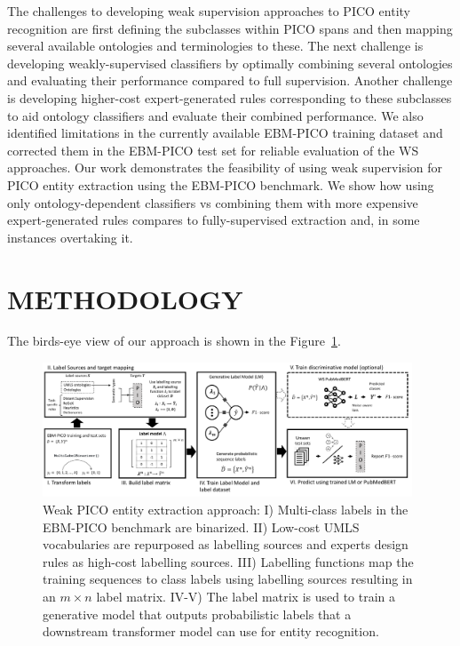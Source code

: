 \documentclass[10.7pt,]{article}
\begin{document}
The challenges to developing weak supervision approaches to PICO entity recognition are first defining the subclasses within PICO spans and then mapping several available ontologies and terminologies to these.
The next challenge is developing weakly-supervised classifiers by optimally combining several ontologies and evaluating their performance compared to full supervision.
Another challenge is developing higher-cost expert-generated rules corresponding to these subclasses to aid ontology classifiers and evaluate their combined performance.
We also identified limitations in the currently available EBM-PICO training dataset and corrected them in the EBM-PICO test set for reliable evaluation of the WS approaches.
Our work demonstrates the feasibility of using weak supervision for PICO entity extraction using the EBM-PICO benchmark.
We show how using only ontology-dependent classifiers vs combining them with more expensive expert-generated rules compares to fully-supervised extraction and, in some instances overtaking it.
%
%
%
\section{METHODOLOGY}\label{methods}
%
The birds-eye view of our approach is shown in the Figure~\ref{fig:approach}.
%
\begin{figure}[ht]
\centering
\includegraphics[width=0.98\textwidth]{figures/approach.pdf}
\caption{Weak PICO entity extraction approach: I) Multi-class labels in the EBM-PICO benchmark are binarized. II) Low-cost UMLS vocabularies are repurposed as labelling sources and experts design rules as high-cost labelling sources. III) Labelling functions map the training sequences to class labels using labelling sources resulting in an $m \times n$ label matrix. IV-V) The label matrix is used to train a generative model that outputs probabilistic labels that a downstream transformer model can use for entity recognition.}
\label{fig:approach}
\end{figure}
%
\end{document}
